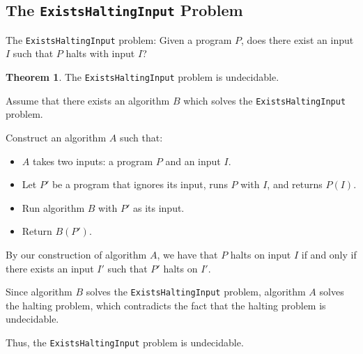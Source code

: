 \documentclass[11pt]{article}
\makeatletter
\theoremstyle{definition}
\newtheorem{thm}{Theorem}[section]
\newenvironment{pf}[1][\proofname]{\par
  \pushQED{\qed}%
  \normalfont \topsep0\p@\relax
  \trivlist
  \item[\hskip\labelsep\itshape
  #1\@addpunct{.}]\ignorespaces
}{%
  \popQED\endtrivlist\@endpefalse
}
\makeatother
\begin{document}
\subsection{The {\tt ExistsHaltingInput} Problem}
The {\tt ExistsHaltingInput} problem: Given a program $P$, does there exist an input $I$ such that $P$ halts with input $I$?
\begin{thm}
The {\tt ExistsHaltingInput} problem is undecidable.
\begin{pf}
Assume that there exists an algorithm $B$ which solves the {\tt ExistsHaltingInput} problem.

Construct an algorithm $A$ such that:\vspace{-1.5ex}
\begin{itemize}
    \item $A$ takes two inputs: a program $P$ and an input $I$.
    \item Let $P'$ be a program that ignores its input, runs $P$ with $I$, and returns $P(I)$.
    \item Run algorithm $B$ with $P'$ as its input.
    \item Return $B(P')$.
\end{itemize}\vspace{-1.5ex}
By our construction of algorithm $A$, we have that $P$ halts on input $I$ if and only if there exists an input $I'$ such that $P'$ halts on $I'$. 

Since algorithm $B$ solves the {\tt ExistsHaltingInput} problem, algorithm $A$ solves the halting problem, which contradicts the fact that the halting problem is undecidable.

Thus, the {\tt ExistsHaltingInput} problem is undecidable.
\end{pf}
\end{thm}
\end{document}
